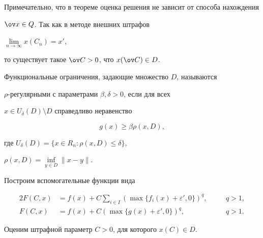 Примечательно, что в теореме оценка решения не зависит от способа нахождения


$\ov x\in Q$. Так как в методе внешних штрафов


$\lim\limits_{n\to\infty}x(C_n)=x'$,


то существует такое $\ov C>0$, что $x(\ov C)\in D$. 





\begin{defn}


Функциональные ограничения, задающие множество $D$, называются


$\rho$-регулярными с параметрами $\beta, \delta>0$, если для всех


$x\in U_\delta(D)\setminus D$ справедливо неравенство


$$


g(x)\geq\beta\rho(x,D),


$$


где $U_\delta(D)=\{x\in R_n:\rho(x,D)\leq\delta\}$, 


$\rho(x,D)=\inf\limits_{y\in D}\|x-y\|$.


\end{defn}





Построим вспомогательные функции вида


\begin{alignat}{2}\label{stf1}


F(C,x)&=f(x)+C\sum_{i\in I}(\max\{f_i(x)+\varepsilon',0\})^q,


&\quad &q>1, \\


%


\label{stf2}


F(C,x)&=f(x)+C(\max\{g(x)+\varepsilon',0\})^q, &\quad &q>1.


\end{alignat}


Оценим штрафной параметр $C>0$, для которого $x(C)\in D$.





